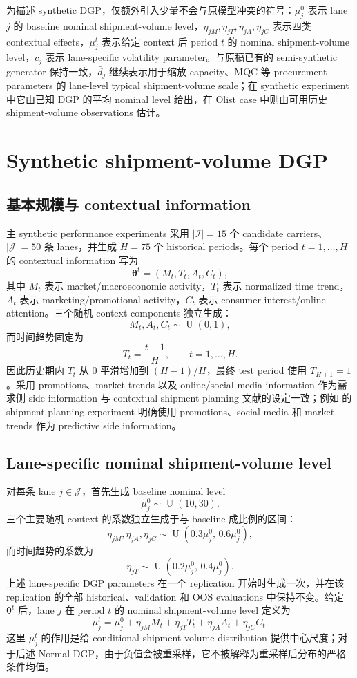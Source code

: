 \documentclass[11pt,a4paper]{ctexart}
\newcommand{\I}{\mathcal I}
\newcommand{\J}{\mathcal J}
\newcommand{\U}{\operatorname{U}}
\begin{document}
为描述 synthetic DGP，仅额外引入少量不会与原模型冲突的符号：$\mu_j^0$ 表示 lane $j$ 的 baseline nominal shipment-volume level，$\eta_{jM},\eta_{jT},\eta_{jA},\eta_{jC}$ 表示四类 contextual effects，$\mu_j^t$ 表示给定 context 后 period $t$ 的 nominal shipment-volume level，$c_j$ 表示 lane-specific volatility parameter。与原稿已有的 semi-synthetic generator 保持一致，$\bar d_j$ 继续表示用于缩放 capacity、MQC 等 procurement parameters 的 lane-level typical shipment-volume scale；在 synthetic experiment 中它由已知 DGP 的平均 nominal level 给出，在 Olist case 中则由可用历史 shipment-volume observations 估计。

\section{Synthetic shipment-volume DGP}

\subsection{基本规模与 contextual information}

主 synthetic performance experiments 采用 $|\I|=15$ 个 candidate carriers、$|\J|=50$ 条 lanes，并生成 $H=75$ 个 historical periods。每个 period $t=1,\ldots,H$ 的 contextual information 写为
\[
\boldsymbol\theta^t=(M_t,T_t,A_t,C_t),
\]
其中 $M_t$ 表示 market/macroeconomic activity，$T_t$ 表示 normalized time trend，$A_t$ 表示 marketing/promotional activity，$C_t$ 表示 consumer interest/online attention。三个随机 context components 独立生成：
\[
M_t,A_t,C_t\sim \U(0,1),
\]
而时间趋势固定为
\[
T_t=\frac{t-1}{H},\qquad t=1,\ldots,H.
\]
因此历史期内 $T_t$ 从 $0$ 平滑增加到 $(H-1)/H$，最终 test period 使用 $T_{H+1}=1$。采用 promotions、market trends 以及 online/social-media information 作为需求侧 side information 与 contextual shipment-planning 文献的设定一致；例如 \citet{bertsimas2022} 的 shipment-planning experiment 明确使用 promotions、social media 和 market trends 作为 predictive side information。

\subsection{Lane-specific nominal shipment-volume level}

对每条 lane $j\in\J$，首先生成 baseline nominal level
\[
\mu_j^0\sim \U(10,30).
\]
三个主要随机 context 的系数独立生成于与 baseline 成比例的区间：
\[
\eta_{jM},\eta_{jA},\eta_{jC}\sim \U(0.3\mu_j^0,\,0.6\mu_j^0),
\]
而时间趋势的系数为
\[
\eta_{jT}\sim \U(0.2\mu_j^0,\,0.4\mu_j^0).
\]
上述 lane-specific DGP parameters 在一个 replication 开始时生成一次，并在该 replication 的全部 historical、validation 和 OOS evaluations 中保持不变。给定 $\boldsymbol\theta^t$ 后，lane $j$ 在 period $t$ 的 nominal shipment-volume level 定义为
\[
\mu_j^t
=\mu_j^0
+\eta_{jM}M_t
+\eta_{jT}T_t
+\eta_{jA}A_t
+\eta_{jC}C_t.
\]
这里 $\mu_j^t$ 的作用是给 conditional shipment-volume distribution 提供中心尺度；对于后述 Normal DGP，由于负值会被重采样，它不被解释为重采样后分布的严格条件均值。
\end{document}
